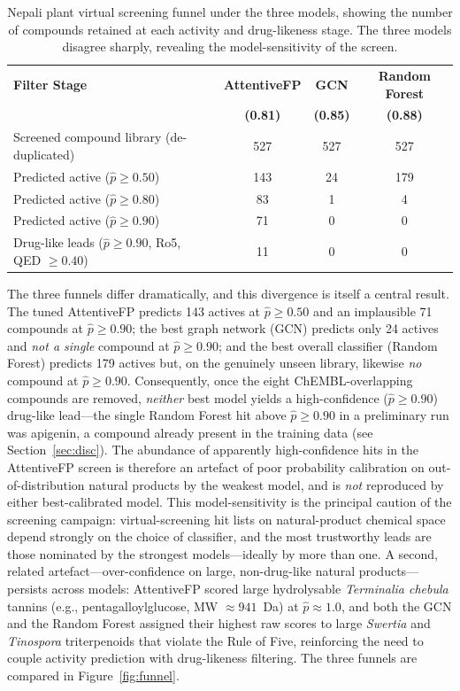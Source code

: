 \begin{table}[H]
\centering
\caption{Nepali plant virtual screening funnel under the three models, showing the
         number of compounds retained at each activity and drug-likeness stage. The
         three models disagree sharply, revealing the model-sensitivity of the screen.}
\label{tab:vs_summary}
{\singlespacing
\begin{tabular}{lccc}
\toprule
\textbf{Filter Stage} & \textbf{AttentiveFP} & \textbf{GCN} & \textbf{Random Forest} \\
                      & \textbf{(0.81)}      & \textbf{(0.85)} & \textbf{(0.88)} \\
\midrule
Screened compound library (de-duplicated)       & 527 & 527 & 527 \\
Predicted active ($\hat{p} \geq 0.50$)          & 143 &  24 & 179 \\
Predicted active ($\hat{p} \geq 0.80$)          &  83 &   1 &   4 \\
Predicted active ($\hat{p} \geq 0.90$)          &  71 &   0 &   0 \\
Drug-like leads ($\hat{p} \geq 0.90$, Ro5, QED $\geq 0.40$) & 11 & 0 & 0 \\
\bottomrule
\end{tabular}
}
\end{table}

The three funnels differ dramatically, and this divergence is itself a central
result. The tuned AttentiveFP predicts 143 actives at $\hat{p} \geq 0.50$ and an
implausible 71 compounds at $\hat{p} \geq 0.90$; the best graph network (GCN)
predicts only 24 actives and \emph{not a single} compound at $\hat{p} \geq 0.90$;
and the best overall classifier (Random Forest) predicts 179 actives but, on the
genuinely unseen library, likewise \emph{no} compound at $\hat{p} \geq 0.90$.
Consequently, once the eight ChEMBL-overlapping compounds are removed, \emph{neither}
best model yields a high-confidence ($\hat{p} \geq 0.90$) drug-like lead---the single
Random Forest hit above $\hat{p} \geq 0.90$ in a preliminary run was apigenin, a
compound already present in the training data (see Section~\ref{sec:disc}). The
abundance of apparently high-confidence hits in the AttentiveFP screen is therefore an
artefact of poor probability calibration on out-of-distribution natural products by
the weakest model, and is \emph{not} reproduced by either best-calibrated model. This
model-sensitivity is the principal caution of the screening campaign: virtual-screening
hit lists on natural-product chemical space depend strongly on the choice of
classifier, and the most trustworthy leads are those nominated by the strongest
models---ideally by more than one. A second, related artefact---over-confidence on
large, non-drug-like natural products---persists across models: AttentiveFP scored
large hydrolysable \textit{Terminalia chebula} tannins (e.g., pentagalloylglucose,
MW $\approx 941$~Da) at $\hat{p} \approx 1.0$, and both the GCN and the Random Forest
assigned their highest raw scores to large \textit{Swertia} and \textit{Tinospora}
triterpenoids that violate the Rule of Five, reinforcing the need to couple activity
prediction with drug-likeness filtering. The three funnels are compared in
Figure~\ref{fig:funnel}.

